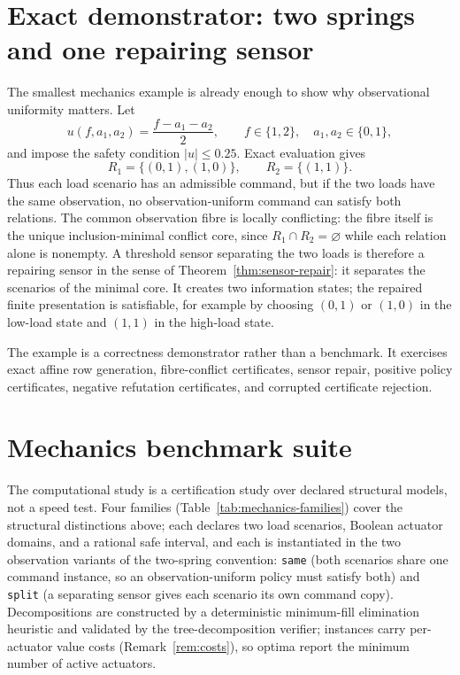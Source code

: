 \documentclass[11pt]{article}
\theoremstyle{plain}
\theoremstyle{definition}
\theoremstyle{remark}
\begin{document}
\section{Exact demonstrator: two springs and one repairing sensor}
\label{sec:two-spring}

The smallest mechanics example is already enough to show why observational
uniformity matters.  Let
\[
  u(f,a_1,a_2)=\frac{f-a_1-a_2}{2},
  \qquad f\in\{1,2\},\quad a_1,a_2\in\{0,1\},
\]
and impose the safety condition \(|u|\le 0.25\).  Exact evaluation gives
\[
  R_1=\{(0,1),(1,0)\},
  \qquad
  R_2=\{(1,1)\}.
\]
Thus each load scenario has an admissible command, but if the two loads have the
same observation, no observation-uniform command can satisfy both relations.
The common observation fibre is locally conflicting: the fibre itself is the
unique inclusion-minimal conflict core, since \(R_1\cap R_2=\varnothing\)
while each relation alone is nonempty.  A threshold sensor separating the two
loads is therefore a repairing sensor in the sense of
Theorem~\ref{thm:sensor-repair}: it separates the scenarios of the minimal
core.  It creates two information states; the repaired finite
presentation is satisfiable, for example by choosing \((0,1)\) or \((1,0)\) in
the low-load state and \((1,1)\) in the high-load state.

The example is a correctness demonstrator rather than a benchmark.  It exercises
exact affine row generation, fibre-conflict certificates, sensor repair,
positive policy certificates, negative refutation certificates, and corrupted
certificate rejection.

\section{Mechanics benchmark suite}
\label{sec:mechanics-benchmarks}

The computational study is a certification study over declared structural
models, not a speed test.  Four families (Table~\ref{tab:mechanics-families})
cover the structural distinctions
above; each declares two load scenarios, Boolean actuator domains, and a
rational safe interval, and each is instantiated in the two observation
variants of the two-spring convention: \texttt{same} (both scenarios share
one command instance, so an observation-uniform policy must satisfy both) and
\texttt{split} (a separating sensor gives each scenario its own command
copy).  Decompositions are constructed by a deterministic minimum-fill
elimination heuristic and validated by the tree-decomposition verifier;
instances carry per-actuator value costs (Remark~\ref{rem:costs}), so optima
report the minimum number of active actuators.
\end{document}
